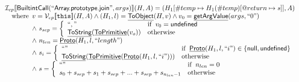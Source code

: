 \documentclass{article}
\makeatletter
\newcommand{\SF}[1]{\mbox{\textsf{#1}}}
\newcommand{\TT}[1]{\mbox{\texttt{#1}}}
\newcommand{\wherec}[1]{{\rm where}\begin{array}[t]{l}#1\end{array}}
\newcommand{\ifc}[1]{{\rm if}\begin{array}[t]{l}#1\end{array}}
\newcommand{\owc}{{\rm otherwise}}
\newcommand{\I}{\mathcal{I}}
\newcommand{\V}{\mathcal{V}}
\newcommand{\lbr}{\llbracket}
\newcommand{\rbr}{\rrbracket}
\newcommand{\hf}[1]{\underline{\sf #1}}
\newcommand{\varloc}[1]{\##1}
\newcommand{\varprop}[1]{@#1}
\makeatother
\begin{document}
\[\begin{array}{l}
\I _{cp}\lbr \SF{BuiltintCall}(``\SF{Array.prototype.join}",args)\rbr(H,A)
 = (H_1[\varloc{temp}\mapsto H_1(\varloc{temp})[\varprop{return}\mapsto s]], A) \\
\quad\wherec{
  v = \V _{cp}\lbr \TT{this}\rbr (H,A) \land (H_1,l) = \hf{ToObject}(H,v)
  \land v_0 = \hf{getArgValue}(args, ``0")\\
  \land\ s_{sep} = \left\{
    \begin{array}{ll}
      ``," & \ifc{v_0 = \SF{undefined}}\\
      \hf{ToString}(\hf{ToPrimitive}(v_o)) & \owc
    \end{array}
    \right.\\
  \land\ n_{len} = \hf{Proto}(H_1, l, ``length")\\
  \land\ s_i = \left\{\begin{array}{ll}
      ``" & \ifc{\hf{Proto}(H_1, l, ``i") \in \{ \SF{null}, \SF{undefined}\}}\\
      \hf{ToString}(\hf{ToPrimitive}(\hf{Proto}(H_1, l, ``i"))) & \owc
    \end{array}\right.\\
  \land\ s = \left\{\begin{array}{ll}
    ``" & \ifc{n_{len} = 0}\\
    s_0 + s_{sep} + s_1 + s_{sep} + ... + s_{sep} + s_{n_{len}-1} & \owc
    \end{array}\right.\\
  }\\
\\\\
\end{array}
\]
\end{document}

